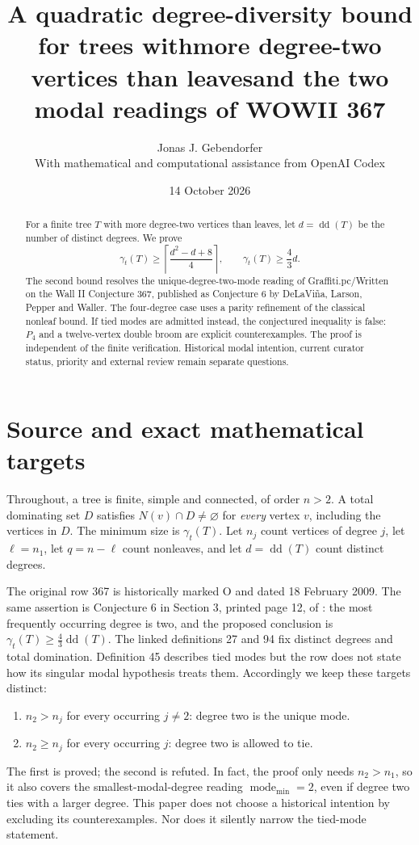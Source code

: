 \documentclass[11pt,a4paper]{article}
\title{A quadratic degree-diversity bound for trees with\newline more degree-two vertices than leaves\newline and the two modal readings of WOWII 367}
\author{Jonas J. Gebendorfer\\\small With mathematical and computational assistance from OpenAI Codex}
\date{14 October 2026}
\newcommand{\gt}{\gamma_t}
\newcommand{\dd}{\operatorname{dd}}
\begin{document}
\maketitle
\begin{abstract}
For a finite tree $T$ with more degree-two vertices than leaves, let $d=\dd(T)$ be the number of distinct degrees. We prove
\[
 \gt(T)\ge \left\lceil\frac{d^2-d+8}{4}\right\rceil,
 \qquad \gt(T)\ge \frac43 d.
\]
The second bound resolves the unique-degree-two-mode reading of Graffiti.pc/Written on the Wall II Conjecture 367, published as Conjecture 6 by DeLaVi\~na, Larson, Pepper and Waller. The four-degree case uses a parity refinement of the classical nonleaf bound. If tied modes are admitted instead, the conjectured inequality is false: $P_4$ and a twelve-vertex double broom are explicit counterexamples. The proof is independent of the finite verification. Historical modal intention, current curator status, priority and external review remain separate questions.
\end{abstract}

\section{Source and exact mathematical targets}
Throughout, a tree is finite, simple and connected, of order $n>2$. A total dominating set $D$ satisfies $N(v)\cap D\ne\varnothing$ for \emph{every} vertex $v$, including the vertices in $D$. The minimum size is $\gt(T)$. Let $n_j$ count vertices of degree $j$, let $\ell=n_1$, let $q=n-\ell$ count nonleaves, and let $d=\dd(T)$ count distinct degrees.

The original row 367 is historically marked O and dated 18 February 2009. The same assertion is Conjecture 6 in Section 3, printed page 12, of \cite{DLPW}: the most frequently occurring degree is two, and the proposed conclusion is $\gt(T)\ge\tfrac43\dd(T)$. The linked definitions 27 and 94 fix distinct degrees and total domination. Definition 45 describes tied modes but the row does not state how its singular modal hypothesis treats them. Accordingly we keep these targets distinct:
\begin{enumerate}
\item $n_2>n_j$ for every occurring $j\ne2$: degree two is the unique mode.
\item $n_2\ge n_j$ for every occurring $j$: degree two is allowed to tie.
\end{enumerate}
The first is proved; the second is refuted. In fact, the proof only needs $n_2>n_1$, so it also covers the smallest-modal-degree reading $\operatorname{mode}_{\min}=2$, even if degree two ties with a larger degree. This paper does not choose a historical intention by excluding its counterexamples. Nor does it silently narrow the tied-mode statement.
\end{document}
